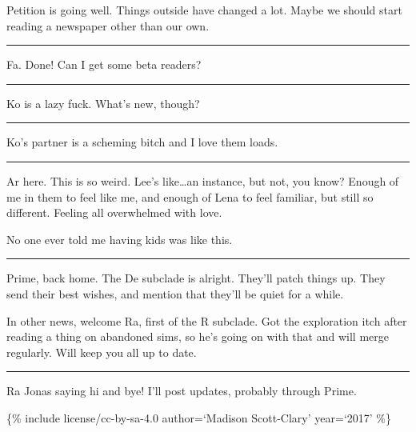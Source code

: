 Petition is going well. Things outside have changed a lot. Maybe we should start reading a newspaper other than our own.

\begin{center}\rule{0.5\linewidth}{\linethickness}\end{center}

Fa. Done! Can I get some beta readers?

\begin{center}\rule{0.5\linewidth}{\linethickness}\end{center}

Ko is a lazy fuck. What's new, though?

\begin{center}\rule{0.5\linewidth}{\linethickness}\end{center}

Ko's partner is a scheming bitch and I love them loads.

\begin{center}\rule{0.5\linewidth}{\linethickness}\end{center}

Ar here. This is so weird. Lee's like\ldots{}an instance, but not, you know? Enough of me in them to feel like me, and enough of Lena to feel familiar, but still so different. Feeling all overwhelmed with love.

No one ever told me having kids was like this.

\begin{center}\rule{0.5\linewidth}{\linethickness}\end{center}

Prime, back home. The De subclade is alright. They'll patch things up. They send their best wishes, and mention that they'll be quiet for a while.

In other news, welcome Ra, first of the R subclade. Got the exploration itch after reading a thing on abandoned sims, so he's going on with that and will merge regularly. Will keep you all up to date.

\begin{center}\rule{0.5\linewidth}{\linethickness}\end{center}

Ra Jonas saying hi and bye! I'll post updates, probably through Prime.

\{\% include license/cc-by-sa-4.0 author=`Madison Scott-Clary' year=`2017' \%\}
